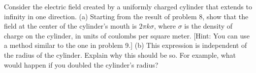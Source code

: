 Consider the electric field created by a uniformly
charged cylinder that extends to infinity in one direction.
(a) Starting from the result of problem 8, show that the
field at the center of the cylinder's mouth is $2\pi k\sigma$,
 where $\sigma$ is the density of charge on
the cylinder, in units of coulombs per square meter. [Hint:
You can use a method similar to the one in problem 9.] (b)
This expression is independent of the radius of the
cylinder. Explain why this should be so. For example, what
would happen if you doubled the cylinder's radius?
